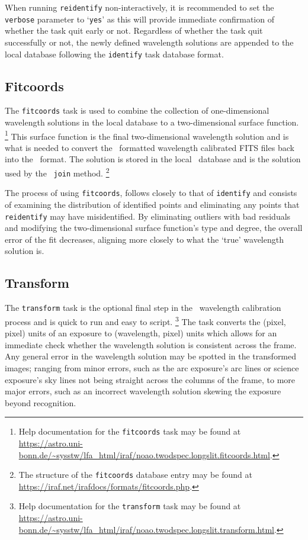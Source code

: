 When running \texttt{reidentify} non-interactively, it is recommended to set the \texttt{verbose} parameter to `\texttt{yes}' as this will provide immediate confirmation of whether the task quit early or not. Regardless of whether the task quit successfully or not, the newly defined wavelength solutions are appended to the local database following the \texttt{identify} task database format.

\subsection{Fitcoords} \label{subsec:pol_fitcoords}

The \texttt{fitcoords} task is used to combine the collection of one-dimensional wavelength solutions in the local database to a two-dimensional surface function.%
\footnote{Help documentation for the \texttt{fitcoords} task may be found at \url{https://astro.uni-bonn.de/~sysstw/lfa_html/iraf/noao.twodspec.longslit.fitcoords.html}.}
This surface function is the final two-dimensional wavelength solution and is what is needed to convert the \iraf\ formatted wavelength calibrated \gls{FITS} files back into the \polsalt\ format. The solution is stored in the local \iraf\ database and is the solution used by the \stops\ \texttt{join} method.%
\footnote{The structure of the \texttt{fitcoords} database entry may be found at \url{https://iraf.net/irafdocs/formats/fitcoords.php}.}

The process of using \texttt{fitcoords}, follows closely to that of \texttt{identify} and consists of examining the distribution of identified points and eliminating any points that \texttt{reidentify} may have misidentified. By eliminating outliers with bad residuals and modifying the two-dimensional surface function's type and degree, the overall error of the fit decreases, aligning more closely to what the `true' wavelength solution is.

\subsection{Transform} \label{subsec:iraf_transform}

The \texttt{transform} task is the optional final step in the \iraf\ wavelength calibration process and is quick to run and easy to script.%
\footnote{Help documentation for the \texttt{transform} task may be found at \url{https://astro.uni-bonn.de/~sysstw/lfa_html/iraf/noao.twodspec.longslit.transform.html}.}
The task converts the (pixel, pixel) units of an exposure to (wavelength, pixel) units which allows for an immediate check whether the wavelength solution is consistent across the frame. Any general error in the wavelength solution may be spotted in the transformed images; ranging from minor errors, such as the arc exposure's arc lines or science exposure's sky lines not being straight across the columns of the frame, to more major errors, such as an incorrect wavelength solution skewing the exposure beyond recognition.

